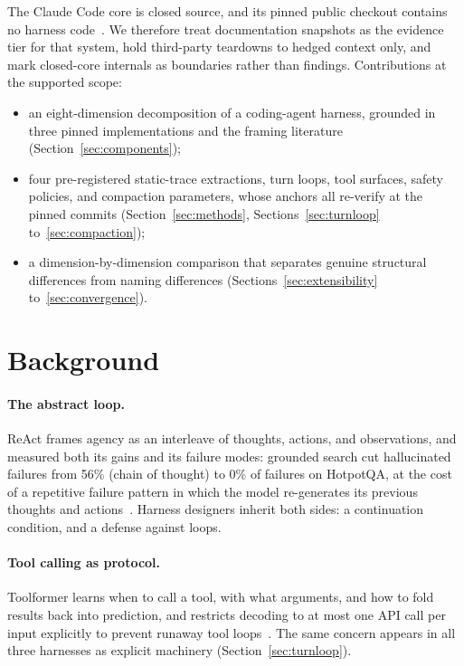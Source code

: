 \documentclass{article}
\newcommand{\ccc}[0]{Claude Code}
\begin{document}
The \ccc{} core is closed source, and its pinned public checkout contains no
harness code~\citep{claudeCodeSurface}. We therefore treat documentation
snapshots as the evidence tier for that system, hold third-party teardowns
to hedged context only, and mark closed-core internals as boundaries rather
than findings. Contributions at the supported scope:

\begin{itemize}
  \item an eight-dimension decomposition of a coding-agent harness, grounded
  in three pinned implementations and the framing literature
  (Section~\ref{sec:components});
  \item four pre-registered static-trace extractions, turn loops, tool
  surfaces, safety policies, and compaction parameters, whose anchors all
  re-verify at the pinned commits (Section~\ref{sec:methods},
  Sections~\ref{sec:turnloop} to~\ref{sec:compaction});
  \item a dimension-by-dimension comparison that separates genuine
  structural differences from naming differences
  (Sections~\ref{sec:extensibility} to~\ref{sec:convergence}).
\end{itemize}

\section{Background}
\label{sec:background}

\paragraph{The abstract loop.} ReAct frames agency as an interleave of
thoughts, actions, and observations, and measured both its gains and its
failure modes: grounded search cut hallucinated failures from 56\% (chain
of thought) to 0\% of failures on HotpotQA, at the cost of a repetitive
failure pattern in which the model re-generates its previous thoughts and
actions~\citep{yao2023react}. Harness designers inherit both sides: a
continuation condition, and a defense against loops.

\paragraph{Tool calling as protocol.} Toolformer learns when to call a tool,
with what arguments, and how to fold results back into prediction, and
restricts decoding to at most one API call per input explicitly to prevent
runaway tool loops~\citep{schick2023toolformer}. The same concern appears in
all three harnesses as explicit machinery (Section~\ref{sec:turnloop}).
\end{document}
